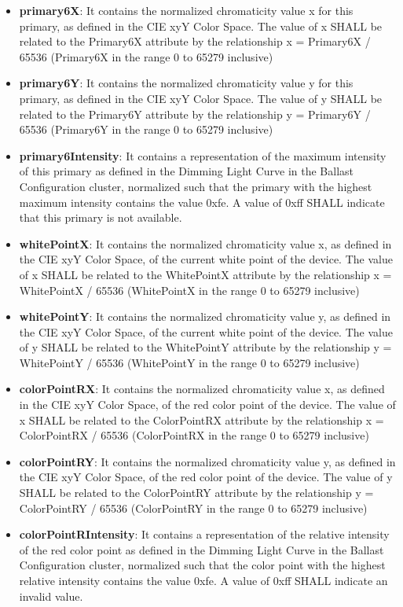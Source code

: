 \begin{itemize}
\item \textbf{primary6X}: It contains the normalized chromaticity value x for this primary, as defined in the CIE xyY Color Space. The value of x SHALL be related to the Primary6X attribute by the relationship x = Primary6X / 65536 (Primary6X in the range 0 to 65279 inclusive)
\item \textbf{primary6Y}: It contains the normalized chromaticity value y for this primary, as defined in the CIE xyY Color Space. The value of y SHALL be related to the Primary6Y attribute by the relationship y = Primary6Y / 65536 (Primary6Y in the range 0 to 65279 inclusive)
\item \textbf{primary6Intensity}: It contains a representation of the maximum intensity of this primary as defined in the Dimming Light Curve in the Ballast Configuration cluster, normalized such that the primary with the highest maximum intensity contains the value 0xfe. A value of 0xff SHALL indicate that this primary is not available.
\item \textbf{whitePointX}: It contains the normalized chromaticity value x, as defined in the CIE xyY Color Space, of the current white point of the device. The value of x SHALL be related to the WhitePointX attribute by the relationship x = WhitePointX / 65536 (WhitePointX in the range 0 to 65279 inclusive)
\item \textbf{whitePointY}: It contains the normalized chromaticity value y, as defined in the CIE xyY Color Space, of the current white point of the device. The value of y SHALL be related to the WhitePointY attribute by the relationship y = WhitePointY / 65536 (WhitePointY in the range 0 to 65279 inclusive)
\item \textbf{colorPointRX}: It contains the normalized chromaticity value x, as defined in the CIE xyY Color Space, of the red color point of the device. The value of x SHALL be related to the ColorPointRX attribute by the relationship x = ColorPointRX / 65536 (ColorPointRX in the range 0 to 65279 inclusive)
\item \textbf{colorPointRY}: It contains the normalized chromaticity value y, as defined in the CIE xyY Color Space, of the red color point of the device. The value of y SHALL be related to the ColorPointRY attribute by the relationship y = ColorPointRY / 65536 (ColorPointRY in the range 0 to 65279 inclusive)
\item \textbf{colorPointRIntensity}: It contains a representation of the relative intensity of the red color point as defined in the Dimming Light Curve in the Ballast Configuration cluster, normalized such that the color point with the highest relative intensity contains the value 0xfe. A value of 0xff SHALL indicate an invalid value.

\end{itemize}
